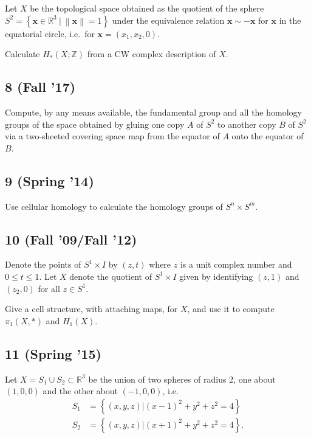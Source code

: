 Let \(X\) be the topological space obtained as the quotient of the
sphere
\(S^2 = \left\{{\mathbf{x} \in {\mathbb{R}}^3 {~\mathrel{\Big\vert}~}{\left\lVert {\mathbf{x}} \right\rVert} = 1}\right\}\)
under the equivalence relation \(\mathbf{x} \sim -\mathbf{x}\) for
\(\mathbf{x}\) in the equatorial circle, i.e.~for
\(\mathbf{x} = (x_1, x_2, 0)\).

Calculate \(H_* (X; {\mathbb{Z}})\) from a CW complex description of
\(X\).

\hypertarget{fall-17-3}{%
\subsection{8 (Fall '17)}\label{fall-17-3}}

Compute, by any means available, the fundamental group and all the
homology groups of the space obtained by gluing one copy \(A\) of
\(S^2\) to another copy \(B\) of \(S^2\) via a two-sheeted covering
space map from the equator of \(A\) onto the equator of \(B\).

\hypertarget{spring-14-1}{%
\subsection{9 (Spring '14)}\label{spring-14-1}}

Use cellular homology to calculate the homology groups of
\(S^n \times S^m\).

\hypertarget{fall-09fall-12}{%
\subsection{10 (Fall '09/Fall '12)}\label{fall-09fall-12}}

Denote the points of \(S^1 \times I\) by \((z, t)\) where \(z\) is a
unit complex number and \(0 \leq t \leq 1\). Let \(X\) denote the
quotient of \(S^1 \times I\) given by identifying \((z, 1)\) and
\((z_2 , 0)\) for all \(z \in S^1\).

Give a cell structure, with attaching maps, for \(X\), and use it to
compute \(\pi_1 (X, \ast)\) and \(H_1 (X)\).

\hypertarget{spring-15-5}{%
\subsection{11 (Spring '15)}\label{spring-15-5}}

Let \(X = S_1 \cup S_2 \subset {\mathbb{R}}^3\) be the union of two
spheres of radius 2, one about \((1, 0, 0)\) and the other about
\((-1, 0, 0)\), i.e.~
\begin{align*}  
S_1 &= \left\{{(x, y,z) \mathrel{\Big|}(x-1)^2 + y^2 +z^2 = 4}\right\} \\
S_2 &= \left\{{(x, y, z) \mathrel{\Big|}(x + 1)^2 + y^2 + z^2 = 4}\right\}
.\end{align*}

